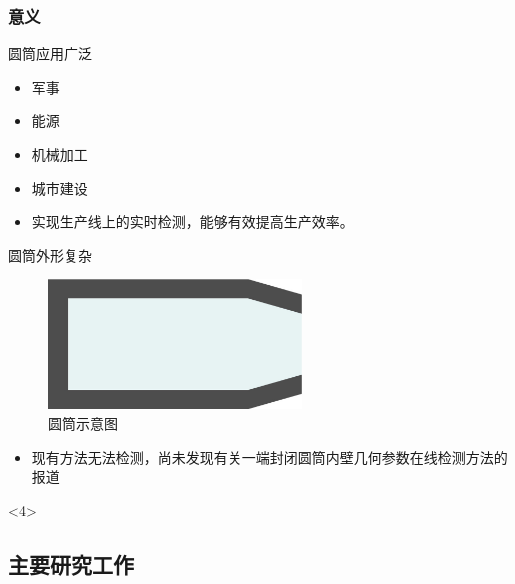 \documentclass{beamer}
\begin{document}
\begin{frame}[label=significance]
  \frametitle{意义}
  \begin{overprint}
      \begin{block}{圆筒应用广泛}
        \begin{itemize}
        \item
        军事
        \item
        能源
        \item
        机械加工
        \item
        城市建设
        \item
        实现生产线上的实时检测，能够有效提高生产效率。
        \end{itemize}
      \end{block}
      \begin{block}{圆筒外形复杂}
        \begin{figure}
        \center
        \includegraphics[width=0.6\textwidth]{image/cylinder}
        \caption{圆筒示意图}
        \end{figure}
      \end{block}
      \begin{itemize}
      \begin{block}{生产环境恶劣}<3->
        经过冲压的圆筒表面温度高达1000摄氏度，一般设备难以在生产现场长期检测。
      \end{block}
      \item<4-| alert@4>
       现有方法无法检测，尚未发现有关一端封闭圆筒内壁几何参数在线检测方法的报道
      \end{itemize}
  \end{overprint}
  \hyperlink{story<1>}{}<4>
\end{frame}

\subsection{主要研究工作}
\end{document}
